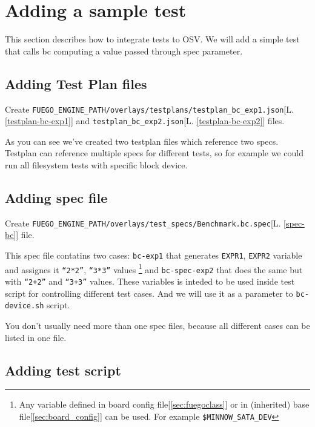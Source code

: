 \section{Adding a sample test}
\label{sec:adding-tests}

This section describes how to integrate tests to OSV.
We will add a simple test that calls bc computing a value passed through spec parameter.

\subsection{Adding Test Plan files}
\label{sec:test-add-testplan}
Create \texttt{FUEGO\_ENGINE\_PATH/overlays/testplans/testplan\_bc\_exp1.json}[L. \ref{testplan-bc-exp1}] and \texttt{testplan\_bc\_exp2.json}[L. \ref{testplan-bc-exp2}] files.

As you can see we've created two testplan files which reference two specs. Testplan can reference multiple specs for different tests, so for example we could run all filesystem tests with specific block device.

\subsection{Adding spec file}
\label{sec:test-add-spec}

Create \texttt{FUEGO\_ENGINE\_PATH/overlays/test\_specs/Benchmark.bc.spec}[L. \ref{spec-bc}] file.

This spec file contatins two cases: \texttt{bc-exp1} that generates \texttt{EXPR1}, \texttt{EXPR2} variable and assignes it \texttt{``2*2''}, \texttt{``3*3''} values \footnote{Any variable defined in board config file[\ref{sec:fuegoclass}] or in (inherited) base file[\ref{sec:board_config}] can be used. For example \texttt{\$MINNOW\_SATA\_DEV}}
and \texttt{bc-spec-exp2} that does the same but with \texttt{``2+2''} and \texttt{``3+3''} values. These variables is inteded to be used inside test script for controlling different test cases. And we will use it as a parameter to \texttt{bc-device.sh} script.

You don't usually need more than one spec files, because all different cases can be listed in one file. 

\subsection{Adding test script}
\label{sec:test-add-script}

